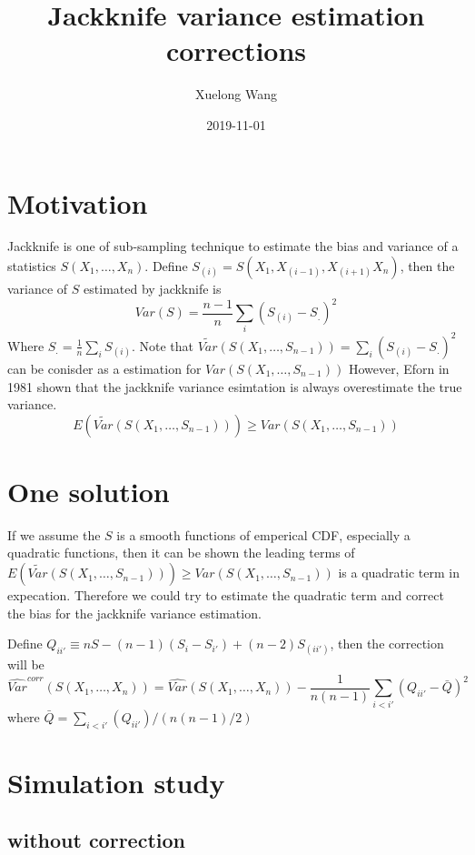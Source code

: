 \documentclass[]{article}
\title{Jackknife variance estimation corrections}
\author{Xuelong Wang}
\date{2019-11-01}
\begin{document}
\maketitle

{
\setcounter{tocdepth}{2}
\tableofcontents
}
\section{Motivation}\label{motivation}

Jackknife is one of sub-sampling technique to estimate the bias and
variance of a statistics \(S(X_1,\dots, X_n)\). Define
\(S_{(i)} = S(X_1,X_{(i-1)},X_{(i+1)} X_n)\), then the variance of \(S\)
estimated by jackknife is \[
Var(S) = \frac{n-1}{n}\sum_i(S_{(i)} - S_.)^2
\] Where \(S_. = \frac{1}{n}\sum_iS_{(i)}\). Note that
\(\tilde{Var}(S(X_1, \dots, S_{n-1})) = \sum_i(S_{(i)} - S_.)^2\) can be
conisder as a estimation for \(Var(S(X_1, \dots, S_{n-1}))\) However,
Eforn in 1981 shown that the jackknife variance esimtation is always
overestimate the true variance. \[
  E(\tilde{Var}(S(X_1, \dots, S_{n-1}))) \geq Var(S(X_1, \dots, S_{n-1}))
\]

\section{One solution}\label{one-solution}

If we assume the \(S\) is a smooth functions of emperical CDF,
especially a quadratic functions, then it can be shown the leading terms
of
\(E(\tilde{Var}(S(X_1, \dots, S_{n-1}))) \geq Var(S(X_1, \dots, S_{n-1}))\)
is a quadratic term in expecation. Therefore we could try to estimate
the quadratic term and correct the bias for the jackknife variance
estimation.

Define \(Q_{ii'} \equiv nS - (n-1)(S_{i} - S_{i'}) + (n-2)S_{(ii')}\),
then the correction will be \[
\hat{Var}^{corr}(S(X_1, \dots, X_n)) = \hat{Var}(S(X_1, \dots, X_n)) - \frac{1}{n(n-1)}\sum_{i < i'}(Q_{ii'}- \bar{Q})^2
\] where \(\bar{Q} = \sum_{i < i'}(Q_{ii'})/(n(n-1)/2)\)

\section{Simulation study}\label{simulation-study}

\subsection{without correction}\label{without-correction}
\end{document}
